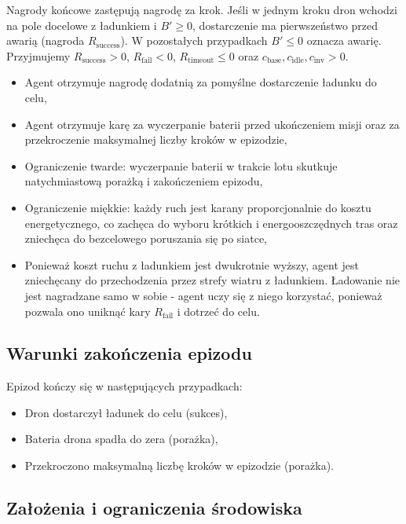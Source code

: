 \documentclass[12pt]{article}
\begin{document}
Nagrody końcowe zastępują nagrodę za krok. Jeśli w jednym kroku dron wchodzi na pole docelowe z ładunkiem i $B' \ge 0$, dostarczenie ma pierwszeństwo przed awarią (nagroda $R_{\text{success}}$). W pozostałych przypadkach $B' \le 0$ oznacza awarię. Przyjmujemy $R_{\text{success}} > 0$, $R_{\text{fail}} < 0$, $R_{\text{timeout}} \le 0$ oraz $c_{\text{base}}, c_{\text{idle}}, c_{\text{inv}} > 0$.
\begin{itemize}
    \item Agent otrzymuje nagrodę dodatnią za pomyślne dostarczenie ładunku do celu,
    \item Agent otrzymuje karę za wyczerpanie baterii przed ukończeniem misji oraz za przekroczenie maksymalnej liczby kroków w epizodzie,
    \item Ograniczenie twarde: wyczerpanie baterii w trakcie lotu skutkuje natychmiastową porażką i zakończeniem epizodu,
    \item Ograniczenie miękkie: każdy ruch jest karany proporcjonalnie do kosztu energetycznego, co zachęca do wyboru krótkich i energooszczędnych tras oraz zniechęca do bezcelowego poruszania się po siatce,
    \item Ponieważ koszt ruchu z ładunkiem jest dwukrotnie wyższy, agent jest zniechęcany do przechodzenia przez strefy wiatru z ładunkiem. Ładowanie nie jest nagradzane samo w sobie - agent uczy się z niego korzystać, ponieważ pozwala ono uniknąć kary $R_{\text{fail}}$ i dotrzeć do celu.
\end{itemize}

\subsection{Warunki zakończenia epizodu}

Epizod kończy się w następujących przypadkach:
\begin{itemize}
    \item Dron dostarczył ładunek do celu (sukces),
    \item Bateria drona spadła do zera (porażka),
    \item Przekroczono maksymalną liczbę kroków w epizodzie (porażka).
\end{itemize}
    
\subsection{Założenia i ograniczenia środowiska}
\end{document}
